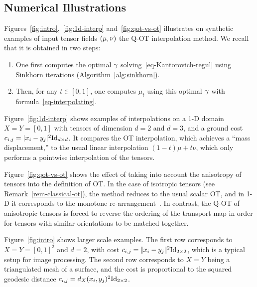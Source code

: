 
\subsection{Numerical Illustrations}
\label{sec-numerics-interp}

Figures~\ref{fig:intro},~\ref{fig:1d-interp} and~\ref{fig:qot-vs-ot} illustrates on synthetic examples of input tensor fields $(\mu,\nu)$ the Q-OT interpolation method. 
%
We recall that it is obtained in two steps:
\begin{enumerate}
	\item One first computes the optimal $\gamma$ solving~\eqref{eq-Kantorovich-regul} using Sinkhorn iterations (Algorithm~\ref{alg:sinkhorn}).
	\item Then, for any $t \in [0,1]$, one computes $\mu_t$ using this optimal $\gamma$ with formula~\eqref{eq-interpolating}.
\end{enumerate}
   
Figure~\ref{fig:1d-interp} shows examples of interpolations on a 1-D domain $X=Y=[0,1]$ with tensors of dimension $d=2$ and $d=3$, and a ground cost $c_{i,j}=|x_i-y_j|^2\mathrm{Id}_{d \times d}$. It compares the OT interpolation, which achieves a ``mass displacement,'' to the usual linear interpolation $(1-t)\mu+t\nu$, which only performs a pointwise interpolation of the tensors. 

Figure~\ref{fig:qot-vs-ot} shows the effect of taking into account the anisotropy of tensors into the definition of OT. In the case of isotropic tensors (see Remark~\ref{rem-classical-ot}), the method reduces to the usual scalar OT, and in 1-D it corresponds to the monotone re-arrangement~\cite{santambrogio2015optimal}. In contrast, the Q-OT of anisotropic tensors is forced to reverse the ordering of the transport map in order for tensors with similar orientations to be matched together. 

Figure~\ref{fig:intro} shows larger scale examples. 
%
The first row corresponds to $X=Y=[0,1]^2$ and $d=2$, with cost $c_{i,j}=|\!| x_i-y_j |\!|^2\mathrm{Id}_{2 \times 2}$, which is a typical setup for image processing.
%
The second row corresponds to $X=Y$ being a triangulated mesh of a surface, and the cost is proportional to the squared geodesic distance $c_{i,j}=d_X(x_i,y_j)^2 \mathrm{Id}_{2\times 2}$. 




